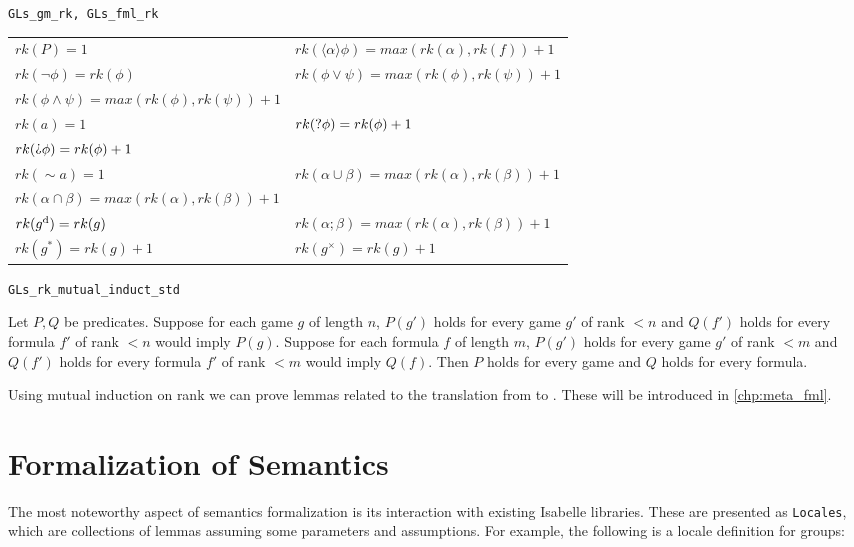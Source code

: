 \begin{bdefinition} 
\label{def:GLs_rk}
\texttt{GLs\_gm\_rk, GLs\_fml\_rk}

    \begin{tabular}{l l}
        $rk(P) = 1$ 
        & $rk (\langle\alpha\rangle\phi) = max(rk (\alpha), rk(f)) + 1$ \\
        $ rk( \neg\phi )= rk(\phi)$ 
        & $rk(\phi\vee\psi)=max(rk (\phi), rk(\psi)) + 1$ \\
        $rk(\phi\wedge\psi)=max(rk (\phi), rk(\psi)) + 1$ \\
        $rk (a) = 1$ 
        & $rk (\text{?}\phi)=rk(\phi)+1$ \\
        $rk (\DTest\phi)=rk(\phi)+1$ \\
        $rk(\sim a)= 1$ 
        & $rk(\alpha\cup\beta)=max(rk (\alpha), rk(\beta)) + 1$ \\
        $rk(\alpha\cap\beta)=max(rk (\alpha), rk(\beta)) + 1$ \\
        $rk(g^\text{d})=rk(g)$ 
        & $rk(\alpha;\beta)=max(rk (\alpha), rk(\beta)) + 1$ \\
        $rk( g^*)=rk(g)+ 1$ 
        & $rk( g^\times)=rk(g)+ 1$ \\
        
    \end{tabular}
    
\end{bdefinition}

\begin{blemma}
\texttt{GLs\_rk\_mutual\_induct\_std}

    Let $P,Q$ be predicates. Suppose for each game $g$ of length $n$, $P(g')$ holds for every game $g'$ of rank $<n$ and $Q(f')$ holds for every formula $f'$ of rank $<n$ would imply $P(g)$. Suppose for each formula $f$ of length $m$, $P(g')$ holds for every game $g'$ of rank $<m$ and $Q(f')$ holds for every formula $f'$ of rank $<m$ would imply $Q(f)$. Then $P$ holds for every \RGL{} game and $Q$ holds for every \GLs{} formula.
\end{blemma}

Using mutual induction on rank we can prove lemmas related to the translation from \GLs{} to \rlGL{}. These will be introduced in \autoref{chp:meta_fml}.

\section{Formalization of Semantics}
The most noteworthy aspect of semantics formalization is its interaction with existing Isabelle libraries. These are presented as \texttt{Locales}, which are collections of lemmas assuming some parameters and assumptions. For example, the following is a locale definition for groups:

